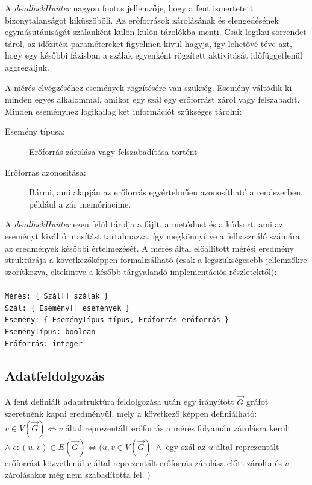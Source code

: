     A \emph{deadlockHunter} nagyon fontos jellemzője, hogy a fent ismertetett bizonytalanságot kiküszöböli. Az erőforrások zárolásának és elengedésének egymásutániságát szálanként külön-külön tárolókba menti. Csak logikai sorrendet tárol, az időzítési paramétereket figyelmen kívül hagyja, így lehetővé téve azt, hogy egy későbbi fázisban a szálak egyenként rögzített aktivitását időfüggetlenül aggregáljuk.
    
    A mérés elvégzéséhez események rögzítésére van szükség. Esemény váltódik ki minden egyes alkalommal, amikor egy szál egy erőforrást zárol vagy felszabadít. Minden eseményhez logikailag két információt szükséges tárolni:
    
    \begin{description}
        \item[Esemény típusa:] Erőforrás zárolása vagy felszabadítása történt
        \item[Erőforrás azonosítása:] Bármi, ami alapján az erőforrás egyértelműen azonosítható a rendszerben, például a zár memóriacíme.
    \end{description}
%
    A \emph{deadlockHunter} ezen felül tárolja a fájlt, a metódust és a kódsort, ami az eseményt kiváltó utasítást tartalmazza, így megkönnyítve a felhasználó számára az eredmények későbbi értelmezését.
    A mérés által előállított mérési eredmény struktúrája a következőképpen formalizálható (csak a legszükségesebb jellemzőkre szorítkozva, eltekintve a később tárgyalandó implementációs részletektől): \\ \\
\texttt{Mérés: \{ Szál[] szálak \} \\
Szál: \{ Esemény[] események \} \\
Esemény: \{ EseményTípus típus, Erőforrás erőforrás \} \\
EseményTípus: boolean \\
Erőforrás: integer \\
}

    \subsection{Adatfeldolgozás}
    A fent definiált adatstruktúra feldolgozása után egy irányított $\overrightarrow{G}$ gráfot szeretnénk kapni eredményül, mely a következő képpen definiálható: $v \in V(\overrightarrow{G}) \Leftrightarrow v$ által reprezentált erőforrás a mérés folyamán zárolásra került $ \wedge \; e : (u, v) \in E(\overrightarrow{G}) \Leftrightarrow (u, v \in V(\overrightarrow{G}) \; \wedge $ egy szál az $u$ által reprezentált erőforrást közvetlenül $v$ által reprezentált erőforrás zárolása előtt zárolta és $v$ zárolásakor még nem szabadította fel. $)$
    
